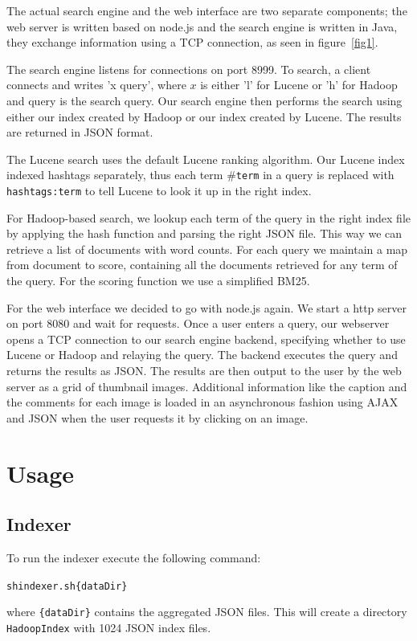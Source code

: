 \documentclass[11pt]{article}
\begin{document}
		The actual search engine and the web interface are two separate components; the web server is written based on node.js and the search engine is written in Java, they exchange information using a TCP connection, as seen in figure~\ref{fig1}.

		The search engine listens for connections on port 8999. To search, a client connects and writes 'x query', where $x$ is either 'l' for Lucene or 'h' for Hadoop and query is the search query. Our search engine then performs the search using either our index created by Hadoop or our index created by Lucene. The results are returned in JSON format.

		The Lucene search uses the default Lucene ranking algorithm. Our Lucene index indexed hashtags separately, thus each term $\#$\texttt{term} in a query is replaced with \texttt{hashtags:term} to tell Lucene to look it up in the right index.

		For Hadoop-based search, we lookup each term of the query in the right index file by applying the hash function and parsing the right JSON file. This way we can retrieve a list of documents with word counts. For each query we maintain a map from document to score, containing all the documents retrieved for any term of the query. For the scoring function we use a simplified BM25.

		For the web interface we decided to go with node.js again. We start a http server on port 8080 and wait for requests. Once a user enters a query, our webserver opens a TCP connection to our search engine backend, specifying whether to use Lucene or Hadoop and relaying the query. The backend executes the query and returns the results as JSON. The results are then output to the user by the web server as a grid of thumbnail images. Additional information like the caption and the comments for each image is loaded in an asynchronous fashion using AJAX and JSON when the user requests it by clicking on an image.



\section{Usage}
	\subsection{Indexer}
		To run the indexer execute the following command:
		\begin{alltt}
			sh indexer.sh \{dataDir\}
		\end{alltt}	
		where \texttt{\{dataDir\}} contains the aggregated JSON files.
		This will create a directory \texttt{HadoopIndex} with 1024 JSON index files.
\end{document}

